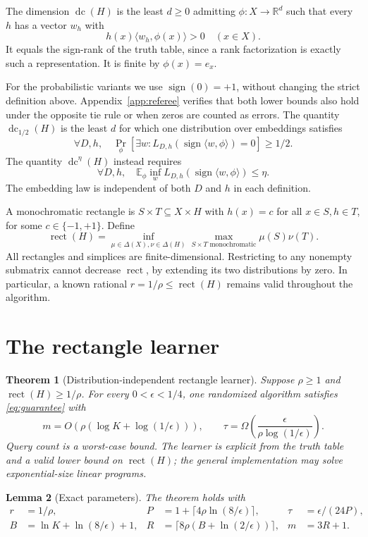 \documentclass[11pt]{article}
\newtheorem{theorem}{Theorem}
\newtheorem{lemma}[theorem]{Lemma}
\DeclareMathOperator{\dc}{dc}
\DeclareMathOperator{\sign}{sign}
\DeclareMathOperator{\rect}{rect}
\newcommand{\R}{\mathbb R}
\newcommand{\E}{\mathbb E}
\newcommand{\1}{\mathbf 1}
\begin{document}
The dimension $\dc(H)$ is the least $d\ge0$ admitting $\phi:X\to\R^d$ such that every $h$ has a vector $w_h$ with
\begin{equation}\label{eq:strict}
 h(x)\langle w_h,\phi(x)\rangle>0\quad(x\in X).
\end{equation}
It equals the sign-rank of the truth table, since a rank factorization is exactly such a representation. It is finite by $\phi(x)=e_x$.

For the probabilistic variants we use $\sign(0)=+1$, without changing the strict definition above. Appendix~\ref{app:referee} verifies that both lower bounds also hold under the opposite tie rule or when zeros are counted as errors. The quantity $\dc_{1/2}(H)$ is the least $d$ for which one distribution over embeddings satisfies
\[
 \forall D,h,\quad \Pr_\phi[\exists w:L_{D,h}(\sign\langle w,\phi\rangle)=0]\ge1/2.
\]
The quantity $\dc^\eta(H)$ instead requires
\[
 \forall D,h,\quad \E_\phi\inf_w L_{D,h}(\sign\langle w,\phi\rangle)\le\eta.
\]
The embedding law is independent of both $D$ and $h$ in each definition.

A monochromatic rectangle is $S\times T\subseteq X\times H$ with $h(x)=c$ for all $x\in S,h\in T$, for some $c\in\{-1,+1\}$. Define
\[
 \rect(H)=\inf_{\mu\in\Delta(X),\nu\in\Delta(H)}
       \max_{S\times T\text{ monochromatic}}\mu(S)\nu(T).
\]
All rectangles and simplices are finite-dimensional. Restricting to any nonempty submatrix cannot decrease $\rect$, by extending its two distributions by zero. In particular, a known rational $r=1/\rho\le\rect(H)$ remains valid throughout the algorithm.

\section{The rectangle learner}
\begin{samepage}
\begin{theorem}[Distribution-independent rectangle learner]\label{thm:main}
Suppose $\rho\ge1$ and $\rect(H)\ge1/\rho$. For every $0<\epsilon<1/4$, one randomized algorithm satisfies \eqref{eq:guarantee} with
\[
 m=O\!\left(\rho(\log K+\log(1/\epsilon))\right),\qquad
 \tau=\Omega\!\left(\frac{\epsilon}{\rho\log(1/\epsilon)}\right).
\]
Query count is a worst-case bound. The learner is explicit from the truth table and a valid lower bound on $\rect(H)$; the general implementation may solve exponential-size linear programs.
\end{theorem}
\end{samepage}
\begin{samepage}
\begin{lemma}[Exact parameters]\label{lem:params}
The theorem holds with
\begin{align}
 r&=1/\rho,&P&=1+\lceil4\rho\ln(8/\epsilon)\rceil,&\tau&=\epsilon/(24P),\label{eq:params1}\\
 B&=\ln K+\ln(8/\epsilon)+1,&R&=\lceil8\rho(B+\ln(2/\epsilon))\rceil,&m&=3R+1.\label{eq:params2}
\end{align}
\end{lemma}
\end{samepage}
\end{document}
